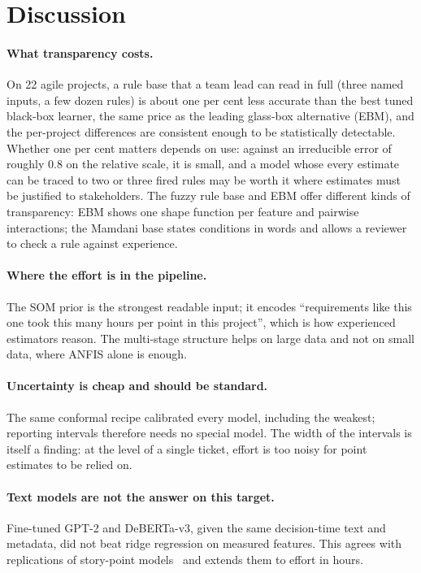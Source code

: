\documentclass[preprint,12pt,authoryear]{elsarticle}
\begin{document}
\section{Discussion}
\label{sec:discussion}

\paragraph{What transparency costs.}  On 22 agile projects, a rule base that a team lead can read in full (three
named inputs, a few dozen rules) is about one per cent less accurate than the best tuned black-box learner, the same
price as the leading glass-box alternative (EBM), and the per-project differences are consistent enough to be
statistically detectable.  Whether one per cent matters depends on use: against an irreducible error of roughly 0.8
on the relative scale, it is small, and a model whose every estimate can be traced to two or three fired rules may be
worth it where estimates must be justified to stakeholders.  The fuzzy rule base and EBM offer different kinds of
transparency: EBM shows one shape function per feature and pairwise interactions; the Mamdani base states conditions
in words and allows a reviewer to check a rule against experience.

\paragraph{Where the effort is in the pipeline.}  The SOM prior is the strongest readable input; it encodes
``requirements like this one took this many hours per point in this project'', which is how experienced estimators
reason.  The multi-stage structure helps on large data and not on small data, where ANFIS alone is enough.

\paragraph{Uncertainty is cheap and should be standard.}  The same conformal recipe calibrated every model,
including the weakest; reporting intervals therefore needs no special model.  The width of the intervals is itself a
finding: at the level of a single ticket, effort is too noisy for point estimates to be relied on.

\paragraph{Text models are not the answer on this target.}  Fine-tuned GPT-2 and DeBERTa-v3, given the same
decision-time text and metadata, did not beat ridge regression on measured features.  This agrees with replications
of story-point models~\citep{tawosi2023deepse,tawosi2022gpt2sprep} and extends them to effort in hours.
\end{document}
